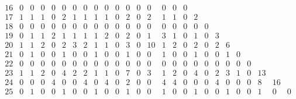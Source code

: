 \begin{landscape}
\[\begin{array}{c|ccccccccccccccccccccccccc}
16&  0&  0&  0&  0&  0&  0&  0&  0&  0&  0&  0&  0&  0&  0&  0&  0&   &   &   &   &   &   &   &   &   \\
17&  1&  1&  1&  0&  2&  1&  1&  1&  1&  0&  2&  0&  2&  1&  1&  0&  2&   &   &   &   &   &   &   &   \\
18&  0&  0&  0&  0&  0&  0&  0&  0&  0&  0&  0&  0&  0&  0&  0&  0&  0&  0&   &   &   &   &   &   &   \\
19&  0&  1&  1&  2&  1&  1&  1&  1&  2&  0&  2&  0&  1&  3&  1&  0&  1&  0&  3&   &   &   &   &   &   \\
20&  1&  1&  2&  0&  2&  3&  2&  1&  1&  0&  3&  0& 10&  1&  2&  0&  2&  0&  2&  6&   &   &   &   &   \\
21&  0&  1&  0&  0&  1&  0&  0&  1&  0&  0&  1&  0&  0&  1&  0&  0&  1&  0&  0&  1&  0&   &   &   &   \\
22&  0&  0&  0&  0&  0&  0&  0&  0&  0&  0&  0&  0&  0&  0&  0&  0&  0&  0&  0&  0&  0&  0&   &   &   \\
23&  1&  1&  2&  0&  4&  2&  2&  1&  1&  0&  7&  0&  3&  1&  2&  0&  4&  0&  2&  3&  1&  0& 13&   &   \\
24&  0&  0&  0&  4&  0&  0&  4&  0&  4&  0&  2&  0&  0&  4&  4&  0&  0&  0&  4&  0&  0&  0&  8& 16&   \\
25&  0&  1&  0&  0&  1&  0&  0&  1&  0&  0&  1&  0&  0&  1&  0&  0&  1&  0&  0&  1&  0&  0&  1&  0&  0\\
\end{array}
\]
\end{landscape}
